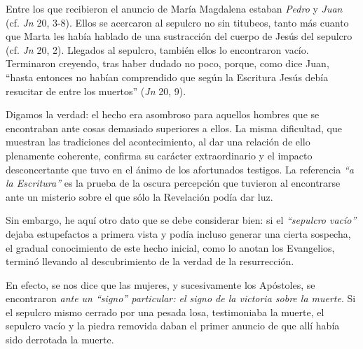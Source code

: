 			\begin{body}Entre los que recibieron el anuncio de María Magdalena estaban \textit{Pedro} y \textit{Juan} (cf. \textit{Jn} 20, 3-8). Ellos se acercaron al sepulcro no sin titubeos, tanto más cuanto que Marta les había hablado de una sustracción del cuerpo de Jesús del sepulcro (cf. \textit{Jn }20, 2). Llegados al sepulcro, también ellos lo encontraron vacío. Terminaron creyendo, tras haber dudado no poco, porque, como dice Juan, “hasta entonces no habían comprendido que según la Escritura Jesús debía resucitar de entre los muertos” (\textit{Jn }20, 9).\end{body}
			
			\begin{body}Digamos la verdad: el hecho era asombroso para aquellos hombres que se encontraban ante cosas demasiado superiores a ellos. La misma dificultad, que muestran las tradiciones del acontecimiento, al dar una relación de ello plenamente coherente, confirma su carácter extraordinario y el impacto desconcertante que tuvo en el ánimo de los afortunados testigos. La referencia\textit{ “a la Escritura” }es la prueba de la oscura percepción que tuvieron al encontrarse ante un misterio sobre el que sólo la Revelación podía dar luz.\end{body}
			
			\begin{body}Sin embargo, he aquí otro dato que se debe considerar bien: si el \textit{“sepulcro vacío”} dejaba estupefactos a primera vista y podía incluso generar una cierta sospecha, el gradual conocimiento de este hecho inicial, como lo anotan los Evangelios, terminó llevando al descubrimiento de la verdad de la resurrección.\end{body}
			
			\begin{body}En efecto, se nos dice que las mujeres, y sucesivamente los Apóstoles, se encontraron \textit{ante un “signo” particular: el signo de la victoria sobre la muerte}. Si el sepulcro mismo cerrado por una pesada losa, testimoniaba la muerte, el sepulcro vacío y la piedra removida daban el primer anuncio de que allí había sido derrotada la muerte.\end{body}
			

